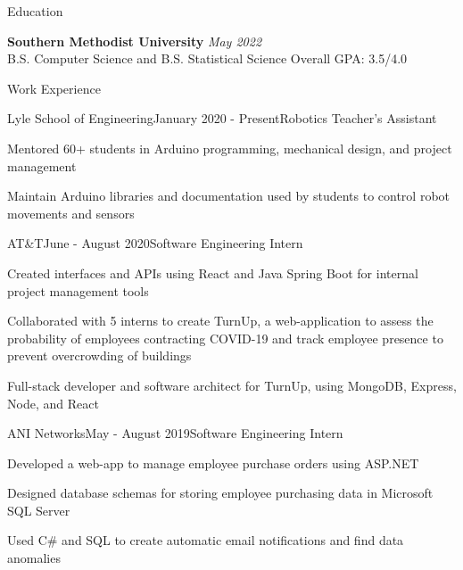 \documentclass{resume} %
\begin{document}

\begin{rSection}{Education}

{\bf Southern Methodist University} \hfill {\em May 2022}
\\ B.S. Computer Science and B.S. Statistical Science \hfill { Overall GPA: 3.5/4.0}

\end{rSection}


\begin{rSection}{Work Experience}
    \begin{rSubsection}{Lyle School of Engineering}{January 2020 - Present}{Robotics Teacher's Assistant}{}
        \item Mentored 60+ students in Arduino programming, mechanical design, and project management
        \item Maintain Arduino libraries and documentation used by students to control robot movements and sensors
    \end{rSubsection}
    
    \begin{rSubsection}{AT\&T}{June - August 2020}{Software Engineering Intern}{}
        \item Created interfaces and APIs using React and Java Spring Boot for internal project management tools
        \item Collaborated with 5 interns to create TurnUp, a web-application to assess the probability of employees contracting COVID-19 and track employee presence to prevent overcrowding of buildings
        \item Full-stack developer and software architect for TurnUp, using MongoDB, Express, Node, and React
    \end{rSubsection}

    \begin{rSubsection}{ANI Networks}{May - August 2019}{Software Engineering Intern}{}
        \item Developed a web-app to manage employee purchase orders using ASP.NET
        \item Designed database schemas for storing employee purchasing data in Microsoft SQL Server
        \item Used C\# and SQL to create automatic email notifications and find data anomalies
    \end{rSubsection}
\end{rSection}
\end{document}
